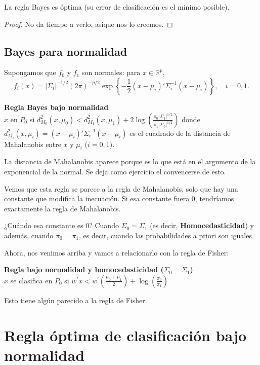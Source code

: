 \begin{prop}
La regla Bayes es óptima (su error de clasificación es el mínimo posible).
\end{prop}
\begin{proof}
No da tiempo a verlo, asique nos lo creemos.
\end{proof}
\subsection{Bayes para normalidad}

Supongamos que $f_0$ y $f_1$ son normales: para $x\in\mathbb{R}^p$,
\[
f_i(x) = |\Sigma_i|^{-1/2}(2\pi)^{-p/2}\exp\left\{-\frac{1}{2}(x-\mu_i)'\Sigma_i^{-1}(x-\mu_i)    \right\},\quad i=0,1.
\]


\textbf{Regla Bayes bajo normalidad}\\
$x$ en $P_0$ si $\displaystyle  d_{M_0}^2(x,\mu_0)<d^2_{M_1}(x,\mu_1)+2\log\left(\frac{\pi_0|\Sigma_1|^{1/2}}{\pi_1|\Sigma_0|^{1/2}}\right)$
donde $\displaystyle d_{M_i}^2(x,\mu_i)=(x-\mu_i)'\Sigma_i^{-1}(x-\mu_i)$ es el cuadrado de la distancia de Mahalanobis entre $x$ y $\mu_i$ ($i=0,1$).

La distancia de Mahalanobis aparece porque es lo que está en el argumento de la exponencial de la normal. Se deja como ejercicio el convencerse de esto.


\obs Vemos que esta regla se parece a la regla de Mahalanobis, solo que hay una constante que modifica la inecuación. Si esa constante fuera 0, tendríamos exactamente la regla de Mahalanobis.

¿Cuándo esa constante es 0? Cuando $Σ_0 = Σ_1$ (es decir, \textbf{Homocedasticidad}) y además, cuando $π_0 = π_1$, es decir, cuando las probabilidades a priori son iguales. 


\obs Ahora, nos venimos arriba y vamos a relacionarlo con la regla de Fisher:

\textbf{Regla bajo normalidad y homocedasticidad ($\Sigma_0=\Sigma_1$)}\\
$x$ se clasifica en $P_0$ si
$\displaystyle  w^\prime  x < w^\prime  \left(\frac{\mu_0+\mu_1}{2}\right)+  \log\left(\frac{\pi_0}{\pi_1}\right)$


Esto tiene algún parecido a la regla de Fisher.


\section{Regla óptima de clasificación bajo normalidad}

